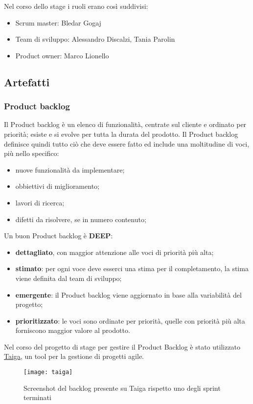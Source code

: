 Nel corso dello stage i ruoli erano così suddivisi:
\begin{itemize}
    \item Scrum master: Bledar Gogaj
    \item Team di sviluppo: Alessandro Discalzi, Tania Parolin
    \item Product owner: Marco Lionello
\end{itemize}

\subsection{Artefatti}

\subsubsection{Product backlog}
Il Product backlog è un elenco di funzionalità, centrate sul cliente e ordinato per priorità; esiste e si evolve per tutta la durata del prodotto. Il Product backlog definisce quindi tutto ciò che deve essere fatto ed include una moltitudine di voci, più nello specifico:
\begin{itemize}
    \item nuove funzionalità da implementare;
    \item obbiettivi di miglioramento;
    \item lavori di ricerca;
    \item difetti da risolvere, se in numero contenuto;
\end{itemize}
Un buon Product backlog è \textbf{DEEP}:
\begin{itemize}
    \item \textbf{dettagliato}, con maggior attenzione alle voci di priorità più alta;
    \item \textbf{stimato}: per ogni voce deve esserci una stima per il completamento, la stima viene definita dal team di sviluppo;
    \item \textbf{emergente}: il Product backlog viene aggiornato in base alla variabilità del progetto;
    \item \textbf{prioritizzato}: le voci sono ordinate per priorità, quelle con priorità più alta forniscono maggior valore al prodotto.
\end{itemize}
Nel corso del progetto di stage per gestire il Product Backlog è stato utilizzato \href{https://taiga.io/}{Taiga}, un tool per la gestione di progetti agile.
\begin{figure}[h]
    \begin{center}
    \texttt{[image: taiga]}
    \caption{Screenshot del backlog presente su Taiga rispetto uno degli sprint terminati}
    \label{fig:figure14}
    \end{center}
\end{figure}
